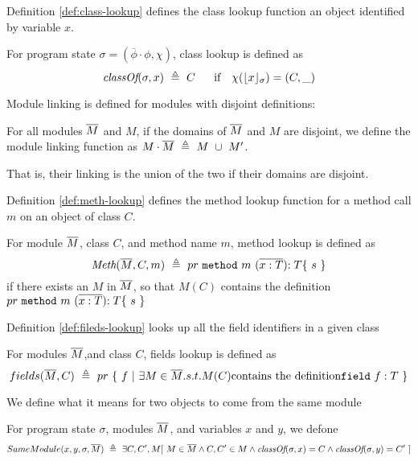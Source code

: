 Definition \ref{def:class-lookup} defines the class lookup function an object 
identified by variable $x$.
\begin{definition}
\label{def:class-lookup}
For program state $\sigma = ({\overline {\phi}}\cdot\phi, \chi)$, class lookup is defined as 
$$\class{\sigma}{x}\ \triangleq\ C \ \ \ \ \ \mbox{if} \ \ \  \chi(\interpret{\sigma}{x})=(C,\_ )$$
\end{definition}

Module linking is defined for modules with disjoint definitions:

\begin{definition}
\label{def:linking}
For all modules $\overline{M}$ and $M$, if the domains of $\overline{M}$ and $M$ are disjoint, 
we define the module linking function as $M\cdot \overline{M}\ \triangleq\ M\ \cup\ M'$.
\end{definition}
That is,  their linking is the union of the two if their domains are disjoint.

Definition \ref{def:meth-lookup} defines the method lookup function for a method
call $m$ on an object of class $C$.
\begin{definition}
\label{def:meth-lookup}
For module $\overline{M}$, class $C$, and method name $m$, method lookup is defined as 
$$\textit{Meth}(\overline{M}, C, m)\ \triangleq\ { pr}\  \mbox{\normalfont{\texttt{method}}}\ m\ (\overline{x : T}) {:T}\{\ s\ \}  $$
if there exists an $M$ in $\overline{M}$, so that $M(C)$ contains the definition ${ pr}\  \prg{method}\ m\ (\overline{x : T}) {:T}\{\ s\ \} $
\end{definition}

Definition \ref{def:fileds-lookup} looks up all the field identifiers in a given class
\begin{definition}
\label{def:fields-lookup}
For modules $\overline{M}$,and  class $C$, fields lookup is defined as 
$$fields(\overline{M},C) \ \triangleq\ { pr}\ \{ \ f  \ | \  \exists  M\in\overline{M}. s.t.  M(C) \mbox{contains the definition}  \mbox{\normalfont{\texttt{field}}}\ f: T\ \} $$
\end{definition}



We define what it means for two objects to come from the same module
\begin{definition}
\label{def:same:module}
For program state $\sigma$,  modules $\overline{M}$, and variables $x$ and $y$, we defone
$$\Same {x} {y} {\sigma}{\Mtwo}\ \triangleq\ \exists C, C', M[ \ M\in \Mtwo \wedge C, C'\in M \wedge  \class{\sigma}{x}=C \wedge \class{\sigma}{y} =C'\ ]$$
\end{definition}

